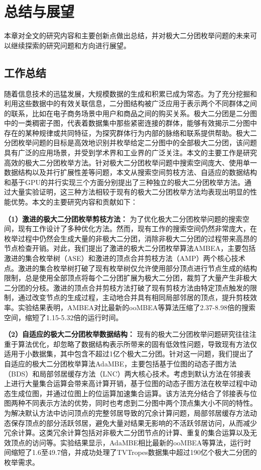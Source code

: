 \chapter{总结与展望}

本章对全文的研究内容和主要创新点做出总结，并对极大二分团枚举问题的未来可以继续探索的研究问题和方向进行展望。

\section{工作总结}

随着信息技术的迅猛发展，大规模数据的生成和积累已成为常态。为了充分挖掘和利用这些数据中的有效关联信息，二分图结构被广泛应用于表示两个不同群体之间的联系，比如在电子商务场景中用户和商品之间的购买关系。极大二分团是二分图中的一类稠密子图，代表着数据集中那些紧密连接的群体，能够有效揭示二分图中存在的某种规律或共同特征，为探究群体行为内部的脉络和联系提供帮助。极大二分团枚举问题的目标是高效地识别并枚举给定二分图中的全部极大二分团，该问题具有广泛的应用场景，并受到学术界和工业界的广泛关注。本文的主要工作是研究高效的极大二分团枚举方法。针对极大二分团枚举问题中搜索空间庞大、使用单一数据结构以及并行扩展性差等问题，本文从搜索空间剪枝方法、自适应的数据结构和基于GPU的并行实现三个方面分别提出了三种独立的极大二分团枚举方法。通过大量实验证明，这三种方法相较于现有的极大二分团枚举方法均表现出明显的性能优势。本文的主要研究内容和贡献如下：

\textbf{（1）激进的极大二分团枚举剪枝方法：} 为了优化极大二分团枚举问题的搜索空间，现有工作设计了多种优化方法。然而，现有工作的搜索空间仍然非常庞大，在枚举过程中仍然会生成大量的非极大二分团，消除非极大二分团的过程带来高昂的节点检查开销。对此，我们提出了激进的极大二分团枚举算法AMBEA，主要包括激进的集合枚举树（ASE）和激进的顶点合并剪枝方法（AMP）两个核心技术点。激进的集合枚举树打破了现有枚举树仅允许使用部分顶点进行节点生成的结构限制，总是使用全部顶点将每个二分团扩展为极大二分团，裁剪了大量产生非极大二分团的分枝。激进的顶点合并剪枝方法打破了现有剪枝方法由特定顶点触发的限制，通过改变节点的生成过程，主动地合并具有相同局部邻居的顶点，提升剪枝效率。实验结果表明，AMBEA对比最新的ooMBEA等算法压缩了2.37-8.98倍的搜索空间，缩短了1.15-5.32倍的运行时间。

\textbf{（2）自适应的极大二分团枚举数据结构：} 现有的极大二分团枚举问题研究往往注重于算法优化，却忽略了数据结构表示所带来的固有低效性问题，导致现有方法仅适用于小数据集，其中包含不超过1亿个极大二分团。针对这一问题，我们提出了自适应的极大二分团枚举算法AdaMBE，主要包括基于位图的动态子图方法（BDS）和局部邻居缓存方法（LNC）两大核心技术。考虑到默认方法在邻接表上进行大量集合运算会带来高计算开销，基于位图的动态子图方法在枚举过程中动态生成位图，并通过位图上的位运算加速集合运算。该方法充分结合了邻接表与位图两种不同表示方法的优势，同时也考虑到二分图中两个顶点集大小不同的特性。为解决默认方法中访问顶点的完整邻居导致的冗余计算问题，局部邻居缓存方法动态保存顶点的部分活跃邻居，避免大量对结果无影响的不活跃邻居访问，从而减少冗余计算。这类冗余计算包括对非极大二分团节点的计算、重复的集合运算以及无效顶点的访问等。实验结果显示，AdaMBE相比最新的ooMBEA等算法，运行时间缩短了1.6至49.7倍，并成功处理了TVTropes数据集中超过190亿个极大二分团的枚举需求。

